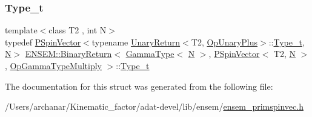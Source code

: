 \subsubsection{\texorpdfstring{Type\_t}{Type\_t}\hspace{0.1cm}{\footnotesize\ttfamily [3/3]}}
{\footnotesize\ttfamily template$<$class T2 , int N$>$ \\
typedef \mbox{\hyperlink{classENSEM_1_1PSpinVector}{P\+Spin\+Vector}}$<$typename \mbox{\hyperlink{structENSEM_1_1UnaryReturn}{Unary\+Return}}$<$T2, \mbox{\hyperlink{structENSEM_1_1OpUnaryPlus}{Op\+Unary\+Plus}}$>$\+::\mbox{\hyperlink{structENSEM_1_1BinaryReturn_3_01GammaType_3_01N_01_4_00_01PSpinVector_3_01T2_00_01N_01_4_00_01OpGammaTypeMultiply_01_4_ad24e9d7f4820559a99b09e0d09b2dec1}{Type\+\_\+t}}, \mbox{\hyperlink{adat__devel_2lib_2hadron_2operator__name__util_8cc_a7722c8ecbb62d99aee7ce68b1752f337}{N}}$>$ \mbox{\hyperlink{structENSEM_1_1BinaryReturn}{E\+N\+S\+E\+M\+::\+Binary\+Return}}$<$ \mbox{\hyperlink{classENSEM_1_1GammaType}{Gamma\+Type}}$<$ \mbox{\hyperlink{adat__devel_2lib_2hadron_2operator__name__util_8cc_a7722c8ecbb62d99aee7ce68b1752f337}{N}} $>$, \mbox{\hyperlink{classENSEM_1_1PSpinVector}{P\+Spin\+Vector}}$<$ T2, \mbox{\hyperlink{adat__devel_2lib_2hadron_2operator__name__util_8cc_a7722c8ecbb62d99aee7ce68b1752f337}{N}} $>$, \mbox{\hyperlink{structENSEM_1_1OpGammaTypeMultiply}{Op\+Gamma\+Type\+Multiply}} $>$\+::\mbox{\hyperlink{structENSEM_1_1BinaryReturn_3_01GammaType_3_01N_01_4_00_01PSpinVector_3_01T2_00_01N_01_4_00_01OpGammaTypeMultiply_01_4_ad24e9d7f4820559a99b09e0d09b2dec1}{Type\+\_\+t}}}



The documentation for this struct was generated from the following file\+:\begin{DoxyCompactItemize}
\item 
/\+Users/archanar/\+Kinematic\+\_\+factor/adat-\/devel/lib/ensem/\mbox{\hyperlink{adat-devel_2lib_2ensem_2ensem__primspinvec_8h}{ensem\+\_\+primspinvec.\+h}}\end{DoxyCompactItemize}
